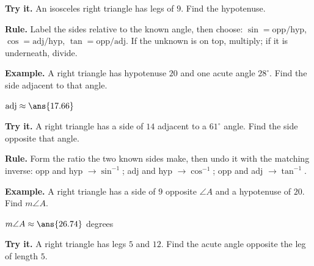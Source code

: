 \documentclass[12pt]{article}
\begin{document}
\begin{tryitbox}
\textbf{Try it.} An isosceles right triangle has legs of $9$. Find the
hypotenuse.\\[2pt]
\end{tryitbox}


\begin{formulabox}
\textbf{Rule.} Label the sides relative to the known angle, then choose:
$\sin = \text{opp}/\text{hyp}$, $\cos = \text{adj}/\text{hyp}$,
$\tan = \text{opp}/\text{adj}$. If the unknown is on top, multiply; if it is
underneath, divide.
\end{formulabox}

\begin{examplebox}
\textbf{Example.} A right triangle has hypotenuse $20$ and one acute angle
$28^\circ$. Find the side adjacent to that angle.

$\text{adj} \approx \ans{17.66}$
\end{examplebox}

\begin{tryitbox}
\textbf{Try it.} A right triangle has a side of $14$ adjacent to a $61^\circ$
angle. Find the side opposite that angle.\\[2pt]
\end{tryitbox}


\begin{formulabox}
\textbf{Rule.} Form the ratio the two known sides make, then undo it with the
matching inverse: opp and hyp $\rightarrow \sin^{-1}$; adj and hyp
$\rightarrow \cos^{-1}$; opp and adj $\rightarrow \tan^{-1}$.
\end{formulabox}

\begin{examplebox}
\textbf{Example.} A right triangle has a side of $9$ opposite $\angle A$ and a
hypotenuse of $20$. Find $m\angle A$.

$m\angle A \approx \ans{26.74}$ degrees
\end{examplebox}

\begin{tryitbox}
\textbf{Try it.} A right triangle has legs $5$ and $12$. Find the acute angle
opposite the leg of length $5$.\\[2pt]
\end{tryitbox}
\end{document}
